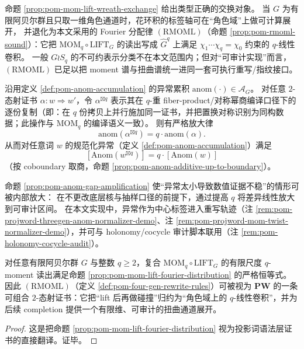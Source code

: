 \begin{remark}\label{rem:pom-wreath-shadow-rmoml}
命题 \ref{prop:pom-mom-lift-wreath-exchange} 给出类型正确的交换对象。
当 \(G\) 为有限阿贝尔群且只取一维角色通道时，花环积的标签轴可在“角色域”上做可计算展开，
并退化为本文采用的 Fourier 分配律 \((\mathrm{RMOML})\)（命题 \ref{prop:pom-rmoml-sound}）：它把 \(\mathrm{MOM}_q\circ \mathrm{LIFT}_G\) 的读出写成 \(\widehat G^q\) 上满足 \(\chi_1\cdots\chi_q=\chi_0\) 约束的 \(q\)-线性卷积。
一般 \(G\wr S_q\) 的不可约表示分类不在本文范围内；但对“可审计实现”而言，\((\mathrm{RMOML})\) 已足以把 moment 谱与扭曲谱统一进同一套可执行重写/指纹接口。
\end{remark}

\begin{proposition}\label{prop:pom-anom-gap-amplification}
沿用定义 \ref{def:pom-anom-accumulation} 的异常累积 \(\mathrm{anom}(\cdot)\in\mathcal{A}_G\)。
对任意 \(2\)-态射证书 \(\alpha:w\Rightarrow w'\)，令 \(\alpha^{\boxtimes q}\) 表示其在 \(q\)-重 fiber-product/对称幂商编译口径下的逐份复制（即：在 \(q\) 份拷贝上并行施加同一证书，并把置换对称识别为同构数据；此操作与 \(\mathrm{MOM}_q\) 的编译语义一致）。
则有严格放大律
\[
\boxed{\;\mathrm{anom}(\alpha^{\boxtimes q})=q\cdot \mathrm{anom}(\alpha).\;}
\]
从而对任意词 \(w\) 的规范化异常（定义 \ref{def:pom-anom-accumulation}）满足
\[
\boxed{\;[\mathrm{Anom}(w^{\boxtimes q})]=q\cdot [\mathrm{Anom}(w)]\;}
\]
（按 coboundary 取商，命题 \ref{prop:pom-anom-additive-up-to-boundary}）。
\end{proposition}

\begin{remark}\label{rem:pom-anom-gap-amplification-meaning}
命题 \ref{prop:pom-anom-gap-amplification} 使“异常太小导致数值证据不稳”的情形可被内部放大：
在不更改底层核与抽样口径的前提下，通过提高 \(q\) 将差异线性放大到可审计区间。
在本文实现中，异常作为中心标签进入重写轨迹（注 \ref{rem:pom-projword-threegen-anom-normalizer-demo}、注 \ref{rem:pom-projword-mom-twist-normalizer-demo}），并可与 holonomy/cocycle 审计脚本联用（注 \ref{rem:pom-holonomy-cocycle-audit}）。
\end{remark}

\begin{proposition}\label{prop:pom-rmoml-sound}
对任意有限阿贝尔群 \(G\) 与整数 \(q\ge 2\)，复合 \(\mathrm{MOM}_q\circ \mathrm{LIFT}_G\) 的有限尺度 \(q\)-moment 读出满足命题 \ref{prop:pom-mom-lift-fourier-distribution} 的严格恒等式。
因此 \((\mathrm{RMOML})\)（定义 \ref{def:pom-four-gen-rewrite-rules}）可被视为 \(\mathbf{PW}\) 的一条可组合 \(2\)-态射证书：它把“lift 后再做碰撞”归约为“角色域上的 \(q\)-线性卷积”，并为后续 completion 提供一个有限维、可审计的扭曲通道展开。
\end{proposition}
\begin{proof}
这是把命题 \ref{prop:pom-mom-lift-fourier-distribution} 视为投影词语法层证书的直接翻译。证毕。
\end{proof}

